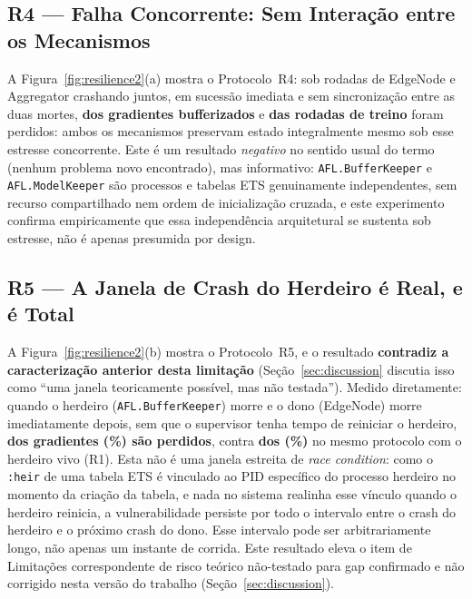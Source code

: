 \documentclass[conference,a4paper]{IEEEtran}
\begin{document}
\subsection{R4 --- Falha Concorrente: Sem Interação entre os Mecanismos}
\label{sec:r4}

A Figura~\ref{fig:resilience2}(a) mostra o Protocolo~R4: sob
\statExpRFourTrials{} rodadas de EdgeNode e Aggregator crashando juntos,
em sucessão imediata e sem sincronização entre as duas mortes,
\textbf{\statExpRFourBufferLost{} dos \statExpRFourBufferWritten{}
gradientes bufferizados} e \textbf{\statExpRFourRoundsLost{} das
\statExpRFourRoundsTrained{} rodadas de treino} foram perdidos: ambos
os mecanismos preservam estado integralmente mesmo sob esse estresse
concorrente. Este é um resultado \emph{negativo} no sentido usual do termo
(nenhum problema novo encontrado), mas informativo: \texttt{AFL.BufferKeeper}
e \texttt{AFL.ModelKeeper} são processos e tabelas ETS genuinamente
independentes, sem recurso compartilhado nem ordem de inicialização
cruzada, e este experimento confirma empiricamente que essa independência
arquitetural se sustenta sob estresse, não é apenas presumida por design.

\subsection{R5 --- A Janela de Crash do Herdeiro é Real, e é Total}
\label{sec:r5}

A Figura~\ref{fig:resilience2}(b) mostra o Protocolo~R5, e o resultado
\textbf{contradiz a caracterização anterior desta limitação} (Seção~\ref{sec:discussion}
discutia isso como ``uma janela teoricamente possível, mas não testada'').
Medido diretamente: quando o herdeiro (\texttt{AFL.BufferKeeper}) morre e o
dono (EdgeNode) morre imediatamente depois, sem que o supervisor tenha
tempo de reiniciar o herdeiro,
\textbf{\statExpRFiveHeirDeadLost{} dos \statExpRFiveHeirDeadWritten{}
gradientes (\statExpRFiveHeirDeadPct{}\%) são perdidos}, contra
\textbf{\statExpRFiveHeirAliveLost{} dos \statExpRFiveHeirAliveWritten{}
(\statExpRFiveHeirAlivePct{}\%)} no mesmo protocolo com o herdeiro vivo
(R1). Esta não é uma janela estreita de \textit{race condition}: como o
\texttt{:heir} de uma tabela ETS é vinculado ao PID específico do processo
herdeiro no momento da criação da tabela, e nada no sistema realinha esse
vínculo quando o herdeiro reinicia, a vulnerabilidade persiste por todo o
intervalo entre o crash do herdeiro e o próximo crash do dono. Esse
intervalo pode ser arbitrariamente longo, não apenas um instante de corrida. Este
resultado eleva o item de Limitações correspondente de risco teórico
não-testado para gap confirmado e não corrigido nesta versão do trabalho
(Seção~\ref{sec:discussion}).
\end{document}
